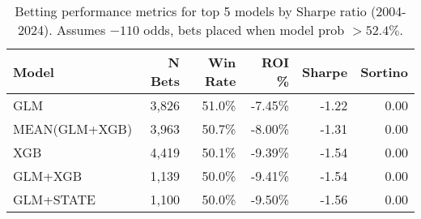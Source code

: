 \begin{table}[t]
  \centering
  \small
  \caption[Betting performance metrics]{Betting performance metrics for top 5 models by Sharpe ratio (2004-2024). Assumes $-110$ odds, bets placed when model prob $> 52.4\%$.}
  \label{tab:betting-performance}
  \setlength{\tabcolsep}{3pt}\renewcommand{\arraystretch}{1.12}
  \begin{tabular}{@{} l r r r r r @{} }
    \toprule
    \textbf{Model}  & \textbf{N Bets}  & \textbf{Win Rate}  & \textbf{ROI \%}  & \textbf{Sharpe}  & \textbf{Sortino} \\
    \midrule
    GLM & 3,826 & 51.0\% & -7.45\% & -1.22 & 0.00 \\
    MEAN(GLM+XGB) & 3,963 & 50.7\% & -8.00\% & -1.31 & 0.00 \\
    XGB & 4,419 & 50.1\% & -9.39\% & -1.54 & 0.00 \\
    GLM+XGB & 1,139 & 50.0\% & -9.41\% & -1.54 & 0.00 \\
    GLM+STATE & 1,100 & 50.0\% & -9.50\% & -1.56 & 0.00 \\
    \bottomrule
  \end{tabular}
\end{table}
